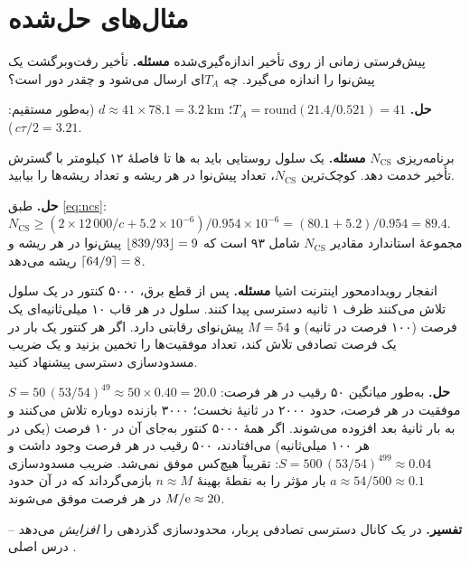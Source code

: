 \documentclass[11pt,a4paper]{article}
\begin{document}
\begin{acnfigure}
  \caption{دسترسی تصادفی دومرحله‌ای  (نسخهٔ ۱۶).}
  \label{fig:twostep}
\end{acnfigure}

\section{مثال‌های حل‌شده}

\begin{examplebox}{پیش‌فرستی زمانی از روی تأخیر اندازه‌گیری‌شده}\label{ex:ta}
\textbf{مسئله.}  تأخیر رفت‌وبرگشت یک پیش‌نوا را  اندازه می‌گیرد. چه $T_A$ای ارسال
می‌شود و  چقدر دور است؟

\textbf{حل.} $T_A = \mathrm{round}(21.4/0.521) = 41$؛ $d \approx 41\times78.1 = \qty{3.2}{\kilo\metre}$
(به‌طور مستقیم: $c\tau/2 = 3.21$\,).
\end{examplebox}

\begin{examplebox}{برنامه‌ریزی $N_{\mathrm{CS}}$}\label{ex:ncs}
\textbf{مسئله.} یک سلول روستایی باید به ها تا فاصلهٔ ۱۲ کیلومتر با گسترش تأخیر  خدمت دهد.
کوچک‌ترین $N_{\mathrm{CS}}$، تعداد پیش‌نوا در هر ریشه و تعداد ریشه‌ها را بیابید.

\textbf{حل.} طبق \cref{eq:ncs}: $N_{\mathrm{CS}} \ge (2\times12\,000/c + 5.2\times10^{-6})/0.954\times10^{-6} =
(80.1+5.2)/0.954 = 89.4$. مجموعهٔ استاندارد مقادیر $N_{\mathrm{CS}}$ شامل ۹۳ است که $\left\lfloor 839/93\right\rfloor = 9$ پیش‌نوا در هر
ریشه و $\left\lceil 64/9\right\rceil = 8$ ریشه می‌دهد.
\end{examplebox}

\begin{examplebox}{انفجار رویدادمحور اینترنت اشیا}\label{ex:burst}
\textbf{مسئله.} پس از قطع برق، ۵۰۰۰ کنتور در یک سلول تلاش می‌کنند ظرف ۱ ثانیه دسترسی پیدا کنند. سلول در هر قاب ۱۰
میلی‌ثانیه‌ای یک فرصت  (۱۰۰ فرصت در ثانیه) و $M = 54$ پیش‌نوای رقابتی دارد. اگر هر کنتور یک بار در یک
فرصت تصادفی تلاش کند، تعداد موفقیت‌ها را تخمین بزنید و یک ضریب مسدودسازی دسترسی پیشنهاد کنید.

\textbf{حل.} به‌طور میانگین ۵۰ رقیب در هر فرصت: $S = 50\,(53/54)^{49} \approx 50\times0.40 = 20.0$ موفقیت در هر فرصت،
حدود ۲۰۰۰ در ثانیهٔ نخست؛ ۳۰۰۰ بازنده دوباره تلاش می‌کنند و به بار ثانیهٔ بعد افزوده می‌شوند. اگر همهٔ ۵۰۰۰ کنتور
به‌جای آن در ۱۰ فرصت (یکی در هر ۱۰۰ میلی‌ثانیه) می‌افتادند، ۵۰۰ رقیب در هر فرصت وجود داشت و
$S = 500\,(53/54)^{499}\approx 0.04$: تقریباً هیچ‌کس موفق نمی‌شد. ضریب مسدودسازی $a\approx 54/500\approx0.1$ بار مؤثر
را به نقطهٔ بهینهٔ $n\approx M$ بازمی‌گرداند که در آن حدود $M/\mathrm{e}\approx20$  در هر فرصت موفق می‌شوند.

\textbf{تفسیر.} در یک کانال دسترسی تصادفی پربار، محدودسازی گذردهی را \emph{افزایش} می‌دهد -- درس اصلی .
\end{examplebox}
\end{document}
